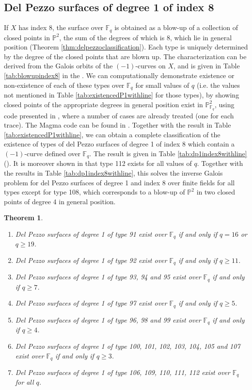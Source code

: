 \documentclass[a4paper, 11pt, reqno]{amsart}
\numberwithin{equation}{section} \numberwithin{figure}{section}
\def \F {{\mathbb F}}
\def \P {{\mathbb P}}
\newtheorem{theorem}[lemma]{Theorem}
\theoremstyle{definition}
\numberwithin{lemma}{section}
\begin{document}
\subsection{Del Pezzo surfaces of degree 1 of index 8}

If $X$ has index 8, the surface over $\F_q$ is obtained as a blow-up of a collection of closed points in $\P^2$, the sum of the degrees of which is $8$, which lie in general position (Theorem \ref{thm:delpezzoclassification}). Each type is uniquely determined by the degree of the closed points that are blown up. The characterization can be derived from the Galois orbits of the $(-1)$-curves on $X$, and is given in Table \ref{tab:blowupindex8} in the . We can computationally demonstrate existence or non-existence of each of these types over $\F_q$ for small values of $q$ (i.e. the values not mentioned in Table \ref{tab:existencedP1withline} for those types), by showing closed points of the appropriate degrees in general position exist in $\P^2_{\F_q}$, using code presented in \cite{BFL}, where a number of cases are already treated (one for each trace). The Magma code can be found in \cite{github_Existence_dP1}. Together with the result in Table \ref{tab:existencedP1withline}, we can obtain a complete classification of the existence of types of del Pezzo surfaces of degree 1 of index 8 which contain a $(-1)$-curve defined over $\F_q$. The result is given in Table \ref{tab:dp1index8withline} (). It is moreover shown in \cite[18]{BFL} that type 112 exists for all values of $q$. Together with the results in Table \ref{tab:dp1index8withline}, this solves the inverse Galois problem for del Pezzo surfaces of degree 1 and index 8 over finite fields for all types except for type 108, which corresponds to a blow-up of $\P^2$ in two closed points of degree 4 in general position.

\begin{theorem}\label{thm:index8}
\begin{enumerate}
    \item Del Pezzo surfaces of degree 1 of type 91 exist over $\F_q$ if and only if $q = 16$ or $q \geq 19$.
    \item Del Pezzo surfaces of degree 1 of type 92 exist over $\F_q$ if and only if $q \geq 11$.
    \item Del Pezzo surfaces of degree 1 of type 93, 94 and 95 exist over $\F_q$ if and only if $q \geq 7$.
    \item Del Pezzo surfaces of degree 1 of type 97 exist over $\F_q$ if and only if $q \geq 5$.
    \item Del Pezzo surfaces of degree 1 of type 96, 98 and 99 exist over $\F_q$ if and only if $q \geq 4$.
    \item Del Pezzo surfaces of degree 1 of type 100, 101, 102, 103, 104, 105 and 107 exist over $\F_q$ if and only if $q \geq 3$.
    \item Del Pezzo surfaces of degree 1 of type 106, 109, 110, 111, 112 exist over $\F_q$ for all $q$.
\end{enumerate}
\end{theorem}
\end{document}
